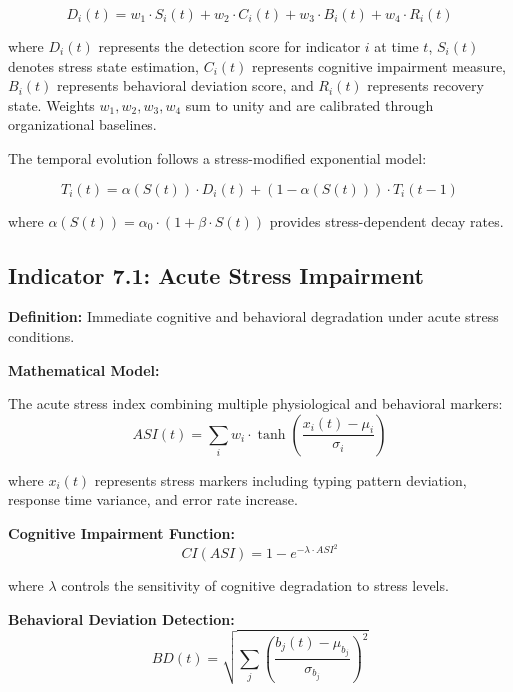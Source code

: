 \documentclass[11pt,a4paper]{article}
\begin{document}
\begin{equation}
D_i(t) = w_1 \cdot S_i(t) + w_2 \cdot C_i(t) + w_3 \cdot B_i(t) + w_4 \cdot R_i(t)
\end{equation}

where $D_i(t)$ represents the detection score for indicator $i$ at time $t$, $S_i(t)$ denotes stress state estimation, $C_i(t)$ represents cognitive impairment measure, $B_i(t)$ represents behavioral deviation score, and $R_i(t)$ represents recovery state. Weights $w_1, w_2, w_3, w_4$ sum to unity and are calibrated through organizational baselines.

The temporal evolution follows a stress-modified exponential model:

\begin{equation}
T_i(t) = \alpha(S(t)) \cdot D_i(t) + (1-\alpha(S(t))) \cdot T_i(t-1)
\end{equation}

where $\alpha(S(t)) = \alpha_0 \cdot (1 + \beta \cdot S(t))$ provides stress-dependent decay rates.

\subsection{Indicator 7.1: Acute Stress Impairment}

\textbf{Definition:} Immediate cognitive and behavioral degradation under acute stress conditions.

\textbf{Mathematical Model:}

The acute stress index combining multiple physiological and behavioral markers:
\begin{equation}
ASI(t) = \sum_{i} w_i \cdot \tanh\left(\frac{x_i(t) - \mu_i}{\sigma_i}\right)
\end{equation}

where $x_i(t)$ represents stress markers including typing pattern deviation, response time variance, and error rate increase.

\textbf{Cognitive Impairment Function:}
\begin{equation}
CI(ASI) = 1 - e^{-\lambda \cdot ASI^2}
\end{equation}

where $\lambda$ controls the sensitivity of cognitive degradation to stress levels.

\textbf{Behavioral Deviation Detection:}
\begin{equation}
BD(t) = \sqrt{\sum_{j} \left(\frac{b_j(t) - \mu_{b_j}}{\sigma_{b_j}}\right)^2}
\end{equation}
\end{document}
